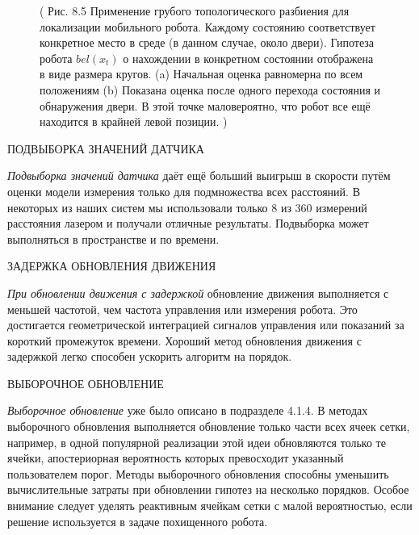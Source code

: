 \documentclass[10pt,a4paper]{article}
\begin{document}
\begin{figure}[H]
	\caption{ ( Рис. 8.5 Применение грубого топологического разбиения для локализации мобильного робота. Каждому состоянию соответствует конкретное место в среде (в данном случае, около двери). Гипотеза робота $bel(x_t)$ о нахождении в конкретном состоянии отображена в виде размера кругов. (a) Начальная оценка равномерна по всем положениям (b) Показана оценка после одного перехода состояния и обнаружения двери. В этой точке маловероятно, что робот все ещё находится в крайней левой позиции. )}
	\label{fig:85orig}
\end{figure}

ПОДВЫБОРКА ЗНАЧЕНИЙ ДАТЧИКА

\textit{Подвыборка значений датчика} даёт ещё больший выигрыш в скорости путём оценки модели измерения только для подмножества всех расстояний. В некоторых из наших систем мы использовали только 8 из 360 измерений расстояния лазером и получали отличные результаты.
Подвыборка может выполняться в пространстве и по времени.

ЗАДЕРЖКА ОБНОВЛЕНИЯ ДВИЖЕНИЯ 

\textit{При обновлении движения с задержкой} обновление движения выполняется с меньшей частотой, чем частота управления или измерения робота. Это достигается геометрической интеграцией сигналов управления или показаний за короткий промежуток времени. Хороший метод обновления движения с задержкой легко способен ускорить алгоритм на порядок.

ВЫБОРОЧНОЕ ОБНОВЛЕНИЕ

\textit{Выборочное обновление} уже было описано в подразделе 4.1.4. В методах выборочного обновления выполняется обновление только части всех ячеек сетки, например, в одной популярной реализации этой идеи обновляются только те ячейки, апостериорная вероятность которых превосходит указанный пользователем порог. Методы выборочного обновления способны уменьшить вычислительные затраты при обновлении гипотез на несколько порядков. Особое внимание следует уделять реактивным ячейкам сетки с малой вероятностью, если решение используется в задаче похищенного робота.
\end{document}
